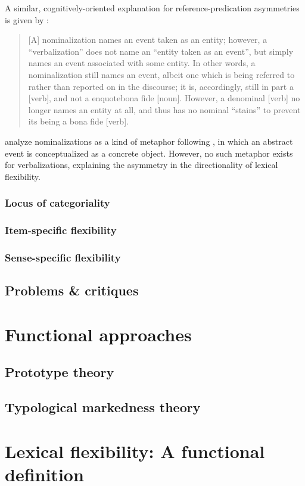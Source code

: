 A similar, cognitively-oriented explanation for reference-predication asymmetries is given by \textcite[745]{HopperThompson1984}:

\blockquote[{\cite[745]{HopperThompson1984}}]{[A] nominalization names an event taken as an entity; however, a \enquote{verbalization} does not name an \enquote{entity taken as an event}, but simply names an event associated with some entity. In other words, a nominalization still names an event, albeit one which is being referred to rather than reported on in the discourse; it is, accordingly, still in part a [verb], and not a enquote{bona fide} [noun]. However, a denominal [verb] no longer names an entity at all, and thus has no nominal \enquote{stains} to prevent its being a bona fide [verb].}

\textcite[746]{HopperThompson1984} analyze nominalizations as a kind of metaphor following \citeauthor[3a]{LakoffJohnson1980}, in which an abstract event is conceptualized as a concrete object. However, no such metaphor exists for verbalizations, explaining the asymmetry in the directionality of lexical flexibility.

\subsubsection{Locus of categoriality}
\label{sec:2.3.2.3}

\subsubsection{Item-specific flexibility}
\label{sec:2.3.2.4}

\subsubsection{Sense-specific flexibility}
\label{sec:2.3.2.5}

\subsection{Problems \& critiques}
\label{sec:2.3.3}

\section{Functional approaches}
\label{sec:2.4}

\subsection{Prototype theory}
\label{sec:2.4.1}

\subsection{Typological markedness theory}
\label{sec:2.4.2}

\section{Lexical flexibility: A functional definition}
\label{sec:2.5}
